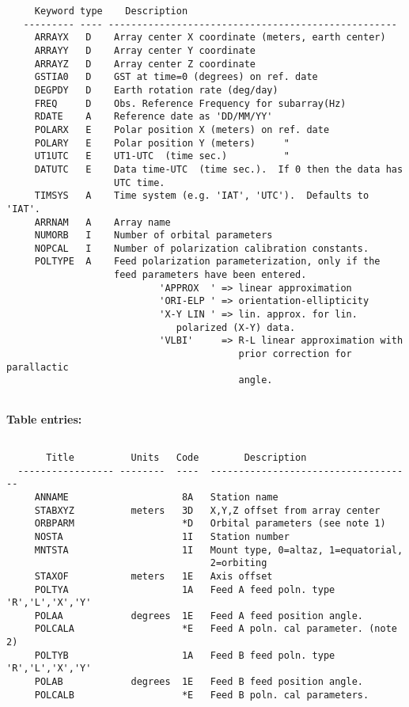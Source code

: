 \begin{verbatim}
     Keyword type    Description
   --------- ---- ---------------------------------------------------
     ARRAYX   D    Array center X coordinate (meters, earth center)
     ARRAYY   D    Array center Y coordinate
     ARRAYZ   D    Array center Z coordinate
     GSTIA0   D    GST at time=0 (degrees) on ref. date
     DEGPDY   D    Earth rotation rate (deg/day)
     FREQ     D    Obs. Reference Frequency for subarray(Hz)
     RDATE    A    Reference date as 'DD/MM/YY'
     POLARX   E    Polar position X (meters) on ref. date
     POLARY   E    Polar position Y (meters)     "
     UT1UTC   E    UT1-UTC  (time sec.)          "
     DATUTC   E    Data time-UTC  (time sec.).  If 0 then the data has
                   UTC time.
     TIMSYS   A    Time system (e.g. 'IAT', 'UTC').  Defaults to 'IAT'.
     ARRNAM   A    Array name
     NUMORB   I    Number of orbital parameters
     NOPCAL   I    Number of polarization calibration constants.
     POLTYPE  A    Feed polarization parameterization, only if the
                   feed parameters have been entered.
                           'APPROX  ' => linear approximation
                           'ORI-ELP ' => orientation-ellipticity
                           'X-Y LIN ' => lin. approx. for lin.
                              polarized (X-Y) data.
                           'VLBI'     => R-L linear approximation with
                                         prior correction for parallactic 
                                         angle. 


\end{verbatim}
{\bf Table entries:}
\begin{verbatim}

       Title          Units   Code        Description
  ----------------- --------  ----  ------------------------------------
     ANNAME                    8A   Station name
     STABXYZ          meters   3D   X,Y,Z offset from array center
     ORBPARM                   *D   Orbital parameters (see note 1)
     NOSTA                     1I   Station number
     MNTSTA                    1I   Mount type, 0=altaz, 1=equatorial,
                                    2=orbiting
     STAXOF           meters   1E   Axis offset
     POLTYA                    1A   Feed A feed poln. type 'R','L','X','Y'
     POLAA            degrees  1E   Feed A feed position angle.
     POLCALA                   *E   Feed A poln. cal parameter. (note 2)
     POLTYB                    1A   Feed B feed poln. type 'R','L','X','Y'
     POLAB            degrees  1E   Feed B feed position angle.
     POLCALB                   *E   Feed B poln. cal parameters.
\end{verbatim}


